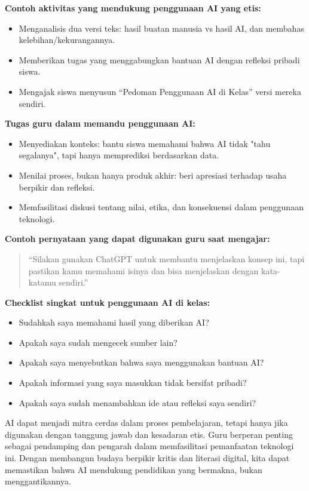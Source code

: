 \textbf{Contoh aktivitas yang mendukung penggunaan AI yang etis:}
\begin{itemize}
	\item Menganalisis dua versi teks: hasil buatan manusia vs hasil AI, dan membahas kelebihan/kekurangannya.
	\item Memberikan tugas yang menggabungkan bantuan AI dengan refleksi pribadi siswa.
	\item Mengajak siswa menyusun “Pedoman Penggunaan AI di Kelas” versi mereka sendiri.
\end{itemize}

\textbf{Tugas guru dalam memandu penggunaan AI:}
\begin{itemize}
	\item Menyediakan konteks: bantu siswa memahami bahwa AI tidak "tahu segalanya", tapi hanya memprediksi berdasarkan data.
	\item Menilai proses, bukan hanya produk akhir: beri apresiasi terhadap usaha berpikir dan refleksi.
	\item Memfasilitasi diskusi tentang nilai, etika, dan konsekuensi dalam penggunaan teknologi.
\end{itemize}

\textbf{Contoh pernyataan yang dapat digunakan guru saat mengajar:}
\begin{quote}
	“Silakan gunakan ChatGPT untuk membantu menjelaskan konsep ini, tapi pastikan kamu memahami isinya dan bisa menjelaskan dengan kata-katamu sendiri.”
\end{quote}

\textbf{Checklist singkat untuk penggunaan AI di kelas:}
\begin{itemize}
	\item Sudahkah saya memahami hasil yang diberikan AI?
	\item Apakah saya sudah mengecek sumber lain?
	\item Apakah saya menyebutkan bahwa saya menggunakan bantuan AI?
	\item Apakah informasi yang saya masukkan tidak bersifat pribadi?
	\item Apakah saya sudah menambahkan ide atau refleksi saya sendiri?
\end{itemize}
  
AI dapat menjadi mitra cerdas dalam proses pembelajaran, tetapi hanya jika digunakan dengan tanggung jawab dan kesadaran etis. Guru berperan penting sebagai pendamping dan pengarah dalam memfasilitasi pemanfaatan teknologi ini. Dengan membangun budaya berpikir kritis dan literasi digital, kita dapat memastikan bahwa AI mendukung pendidikan yang bermakna, bukan menggantikannya.


